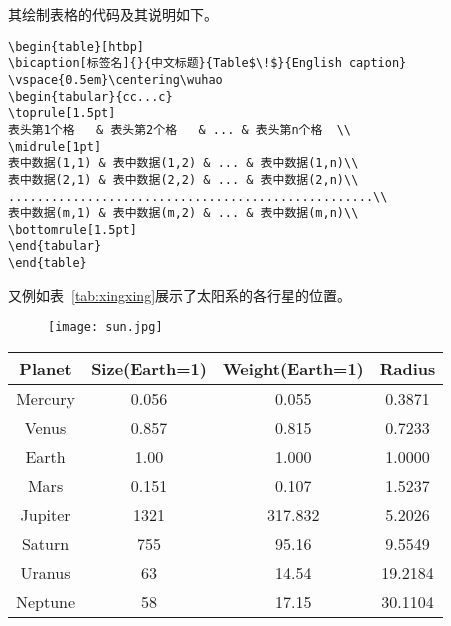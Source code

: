 其绘制表格的代码及其说明如下。
\vspace{1em}
\begin{lstlisting}
\begin{table}[htbp]
\bicaption[标签名]{}{中文标题}{Table$\!$}{English caption}
\vspace{0.5em}\centering\wuhao
\begin{tabular}{cc...c}
\toprule[1.5pt]
表头第1个格   & 表头第2个格   & ... & 表头第n个格  \\
\midrule[1pt]
表中数据(1,1) & 表中数据(1,2) & ... & 表中数据(1,n)\\
表中数据(2,1) & 表中数据(2,2) & ... & 表中数据(2,n)\\
...................................................\\
表中数据(m,1) & 表中数据(m,2) & ... & 表中数据(m,n)\\
\bottomrule[1.5pt]
\end{tabular}
\end{table}
\end{lstlisting}

又例如表~\ref{tab:xingxing}展示了太阳系的各行星的位置。
\begin{figure}[htbp]
  \centering
  \texttt{[image: sun.jpg]}
\end{figure}

\begin{table}[htbp]
  \centering
  \vspace{0.2cm}
  \wuhao
  \begin{tabular}{cccc}
    \toprule
    Planet  & Size(Earth=1) & Weight(Earth=1) & Radius  \\
    \midrule
    Mercury & 0.056         & 0.055           & 0.3871  \\
    Venus   & 0.857         & 0.815           & 0.7233  \\
    Earth   & 1.00          & 1.000           & 1.0000  \\
    Mars    & 0.151         & 0.107           & 1.5237  \\
    Jupiter & 1321          & 317.832         & 5.2026  \\
    Saturn  & 755           & 95.16           & 9.5549  \\
    Uranus  & 63            & 14.54           & 19.2184 \\
    Neptune & 58            & 17.15           & 30.1104 \\
    \bottomrule
  \end{tabular}
\end{table}

